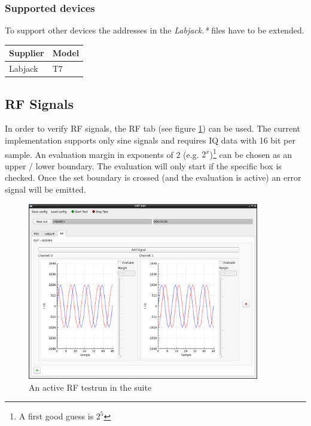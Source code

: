 \documentclass[10pt,a4paper]{article}
\begin{document}
		\subsubsection{Supported devices}
		To support other devices the addresses in the \textit{Labjack.*} files have to be extended.
	
		\begin{table}[H]
		\centering
		\begin{tabular}{ll}
		\toprule
		Supplier			& Model \\ \midrule
		Labjack				& T7 \\
		\bottomrule
		\end{tabular}			
		\end{table}	

	\newpage
	\subsection{RF Signals}	
	In order to verify RF signals, the RF tab (see figure \ref{f:rf_example}) can be used. The current implementation supports only sine signals and requires IQ data with 16 bit per sample. An evaluation margin in exponents of 2 (e.g. $2^x$)\footnote{A first good guess is $2^5$} can be chosen as an upper / lower boundary. The evaluation will only start if the specific box is checked. Once the set boundary is crossed (and the evaluation is active) an error signal will be emitted.
		
		\begin{figure}[H]
\centering
\includegraphics[width=0.9\textwidth]{./6_RF_example.png}
\caption{An active RF testrun in the suite}
\label{f:rf_example}
		\end{figure}
	
\end{document}
